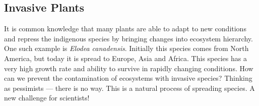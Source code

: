 \subsection{Invasive Plants}
It is common knowledge that many plants are able to adapt to new conditions and repress the indigenous species by bringing changes into ecosystem hierarchy. \\
One such example is \textit{Elodea canadensis}. Initially this species comes from North America, but today it is spread to Europe, Asia and Africa. This species has a very high growth rate and ability to survive in rapidly changing conditions. 
How can we prevent the contamination of ecosystems with invasive species? Thinking as pessimists — there is no way. This is a natural process of spreading species. A new challenge for scientists!
